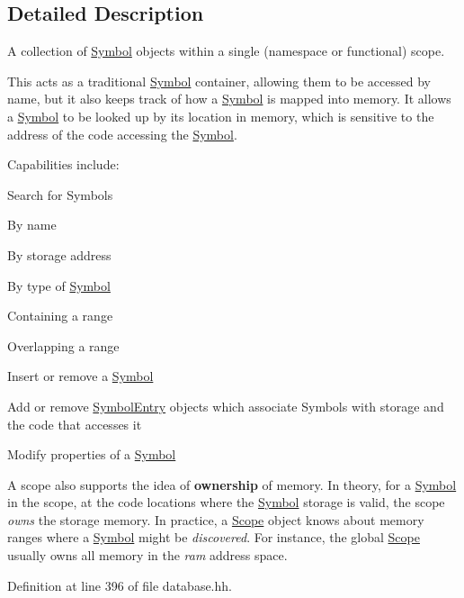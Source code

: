 \subsection{Detailed Description}
A collection of \mbox{\hyperlink{class_symbol}{Symbol}} objects within a single (namespace or functional) scope. 

This acts as a traditional \mbox{\hyperlink{class_symbol}{Symbol}} container, allowing them to be accessed by name, but it also keeps track of how a \mbox{\hyperlink{class_symbol}{Symbol}} is mapped into memory. It allows a \mbox{\hyperlink{class_symbol}{Symbol}} to be looked up by its location in memory, which is sensitive to the address of the code accessing the \mbox{\hyperlink{class_symbol}{Symbol}}.

Capabilities include\+:
\begin{DoxyItemize}
\item Search for Symbols
\begin{DoxyItemize}
\item By name
\item By storage address
\item By type of \mbox{\hyperlink{class_symbol}{Symbol}}
\item Containing a range
\item Overlapping a range
\end{DoxyItemize}
\item Insert or remove a \mbox{\hyperlink{class_symbol}{Symbol}}
\item Add or remove \mbox{\hyperlink{class_symbol_entry}{Symbol\+Entry}} objects which associate Symbols with storage and the code that accesses it
\item Modify properties of a \mbox{\hyperlink{class_symbol}{Symbol}}
\end{DoxyItemize}

A scope also supports the idea of {\bfseries{ownership}} of memory. In theory, for a \mbox{\hyperlink{class_symbol}{Symbol}} in the scope, at the code locations where the \mbox{\hyperlink{class_symbol}{Symbol}} storage is valid, the scope {\itshape owns} the storage memory. In practice, a \mbox{\hyperlink{class_scope}{Scope}} object knows about memory ranges where a \mbox{\hyperlink{class_symbol}{Symbol}} might be {\itshape discovered}. For instance, the global \mbox{\hyperlink{class_scope}{Scope}} usually owns all memory in the {\itshape ram} address space. 

Definition at line 396 of file database.\+hh.



